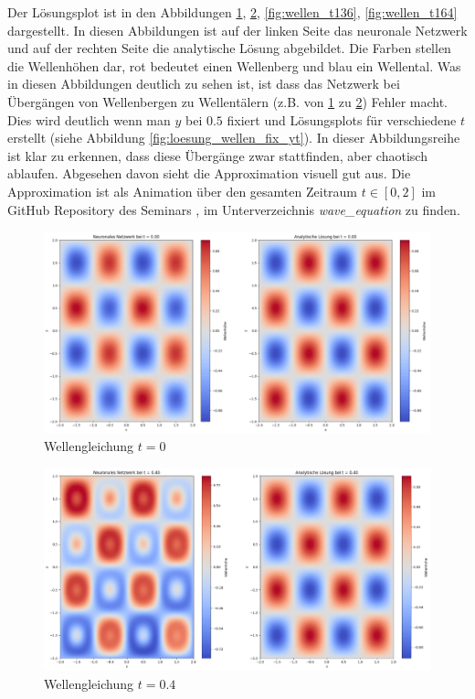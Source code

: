Der Lösungsplot ist in den Abbildungen \ref{fig:wellen_t0}, \ref{fig:wellen_t04}, \ref{fig:wellen_t136}, \ref{fig:wellen_t164} dargestellt.
In diesen Abbildungen ist auf der linken Seite das neuronale Netzwerk und auf der rechten Seite die analytische Lösung abgebildet.
Die Farben stellen die Wellenhöhen dar, rot bedeutet einen Wellenberg und blau ein Wellental.
Was in diesen Abbildungen deutlich zu sehen ist, ist dass das Netzwerk bei Übergängen von Wellenbergen zu Wellentälern (z.B. von \ref{fig:wellen_t0} zu \ref{fig:wellen_t04}) Fehler macht.
Dies wird deutlich wenn man $y$ bei $0.5$ fixiert und Lösungsplots für verschiedene $t$ erstellt (siehe Abbildung \ref{fig:loesung_wellen_fix_yt}).
In dieser Abbildungsreihe ist klar zu erkennen, dass diese Übergänge zwar stattfinden, aber chaotisch ablaufen.
Abgesehen davon sieht die Approximation visuell gut aus.
Die Approximation ist als Animation über den gesamten Zeitraum $t \in [0, 2]$ im GitHub Repository des Seminars \cite{neuronal:github_source_code}, im Unterverzeichnis \emph{wave\_equation} zu finden.
\begin{figure}
    \centering
    \includegraphics[width=\textwidth]{papers/neuronal/images/prediction_wave_t0.png}
    \caption{Wellengleichung $t = 0$}
    \label{fig:wellen_t0}
\end{figure}
\begin{figure}
    \centering
    \includegraphics[width=\textwidth]{papers/neuronal/images/prediction_wave_t04.png}
    \caption{Wellengleichung $t = 0.4$}
    \label{fig:wellen_t04}
\end{figure}
